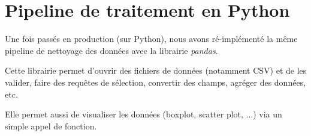 \section{Pipeline de traitement en Python}
    Une fois passés en production (sur Python), nous avons ré-implémenté la même pipeline de nettoyage des données avec la librairie
    \textit{pandas}.

    Cette librairie permet d'ouvrir des fichiers de données (notamment CSV) et de les valider, faire des requêtes de sélection,
    convertir des champs, agréger des données, etc.

    Elle permet aussi de visualiser les données (boxplot, scatter plot, ...) via un simple appel de fonction.